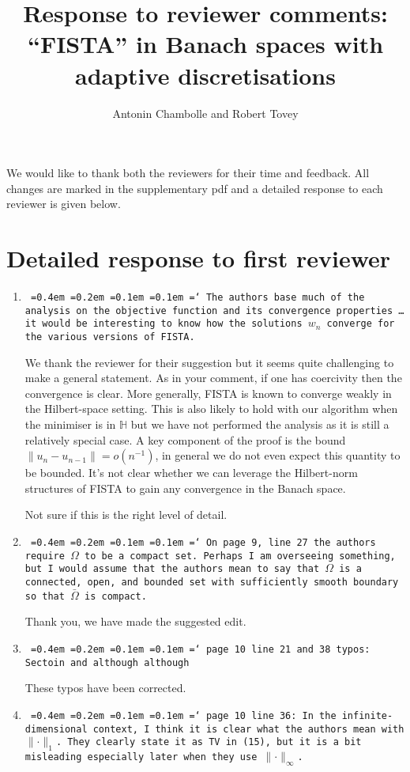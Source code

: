 \documentclass[12pt]{article}
\title{Response to reviewer comments:\\``FISTA'' in Banach spaces with adaptive discretisations}
\author{Antonin Chambolle and Robert Tovey}
\date{\todo{31st October 2021}}
\newcommand*\justify{%
	\fontdimen2\font=0.4em%
	\fontdimen3\font=0.2em%
	\fontdimen4\font=0.1em%
	\fontdimen7\font=0.1em%
	\hyphenchar\font=`\-%
}
\newcommand{\review}[1]{\texttt{\justify{#1}}}
\newcommand{\F}[1]{\mathbb{#1}}
\newcommand{\todo}[1]{{\color{red} #1}}
\begin{document}
\maketitle

We would like to thank both the reviewers for their time and feedback. All changes are marked in the supplementary pdf and a detailed response to each reviewer is given below.


\section{Detailed response to first reviewer}

\begin{enumerate}
	\item \review{The authors base much of the analysis on the objective function and its convergence properties \ldots it would be interesting to know how the solutions $w_n$ converge for the various versions of FISTA.} 
	
	We thank the reviewer for their suggestion but it seems quite challenging to make a general statement. As in your comment, if one has coercivity then the convergence is clear. More generally, FISTA is known to converge weakly in the Hilbert-space setting. This is also likely to hold with our algorithm when the minimiser is in $\F H$ but we have not performed the analysis as it is still a relatively special case. A key component of the proof is the bound $\lVert u_n-u_{n-1}\rVert = o(n^{-1})$, in general we do not even expect this quantity to be bounded. It's not clear whether we can leverage the Hilbert-norm structures of FISTA to gain any convergence in the Banach space.
	
	\todo{Not sure if this is the right level of detail.}

	\item \review{On page 9, line 27 the authors require $\Omega$ to be a compact set. Perhaps I am overseeing something, but I would assume that the authors mean to say that $\Omega$ is a connected, open, and bounded set with sufficiently smooth boundary so that $\bar\Omega$ is compact.}
	
	Thank you, we have made the suggested edit.

	\item \review{page 10 line 21 and 38 typos: Sectoin and although although}
	
	These typos have been corrected.
	
	\item \review{page 10 line 36: In the infinite-dimensional context, I think it is clear what the authors mean with $\lVert\cdot\rVert_1$. They clearly state it as TV in (15), but it is a bit misleading especially later when they use $\lVert\cdot\rVert_\infty$.}
	

\end{enumerate}
\end{document}
